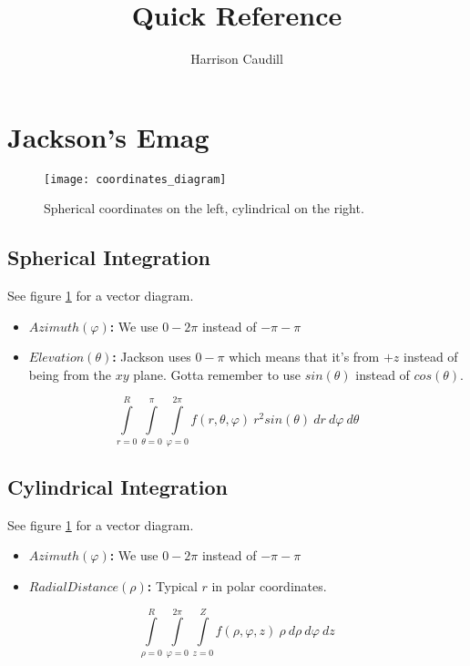 \documentclass{article}
\begin{document}

\graphicspath{{\buildPath/\bookName}}


\title{Quick Reference}
\author{Harrison Caudill}
\date{}
\maketitle

\section{Jackson's Emag}

\begin{figure}
  \begin{center}
  \texttt{[image: coordinates\_diagram]}
  \caption{Spherical coordinates on the left, cylindrical on the
    right.}
  \end{center}
  \label{fig:coordinate-diagrams}
\end{figure}

\subsection{Spherical Integration}

See figure \ref{fig:coordinate-diagrams} for a vector diagram.

\begin{itemize}

\item \textbf{$Azimuth (\varphi)$:} We use $0 - 2\pi$ instead of
  $-\pi - \pi$

\item \textbf{$Elevation (\theta)$:} Jackson uses $0 - \pi$ which
  means that it's from $+z$ instead of being from the $xy$ plane.
  Gotta remember to use $sin(\theta)$ instead of $cos(\theta)$.

\end{itemize}

\begin{equation}
  \int\limits_{r=0}^R \int\limits_{\theta=0}^{\pi} \int\limits_{\varphi=0}^{2\pi}
  f(r, \theta, \varphi)\ r^2sin(\theta)\ dr\ d\varphi\ d\theta
\end{equation}


\subsection{Cylindrical Integration}

See figure \ref{fig:coordinate-diagrams} for a vector diagram.

\begin{itemize}

\item \textbf{$Azimuth (\varphi)$:} We use $0 - 2\pi$ instead of
  $-\pi - \pi$

\item \textbf{$Radial Distance (\rho)$:} Typical $r$ in polar
  coordinates.

\end{itemize}

\begin{equation}
  \int\limits_{\rho=0}^R \int\limits_{\varphi=0}^{2\pi} \int\limits_{z=0}^{Z}
  f(\rho, \varphi, z)\ \rho\ d\rho\ d\varphi\ dz
\end{equation}
\end{document}

